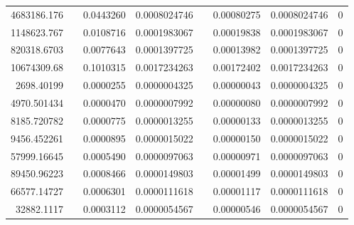 \documentclass[
journal=jacsat, %
manuscript=article]{achemso}
\begin{document}
\begin{table}[htbp]
{\begin{tabular}{rrrrrrrr}
    4683186.176 &       & 0.0443260 & 0.0008024746 &       & 0.00080275 & 0.0008024746 & 0 \\
    1148623.767 &       & 0.0108716 & 0.0001983067 &       & 0.00019838 & 0.0001983067 & 0 \\
    820318.6703 &       & 0.0077643 & 0.0001397725 &       & 0.00013982 & 0.0001397725 & 0 \\
    10674309.68 &       & 0.1010315 & 0.0017234263 &       & 0.00172402 & 0.0017234263 & 0 \\
    2698.40199 &       & 0.0000255 & 0.0000004325 &       & 0.00000043 & 0.0000004325 & 0 \\
    4970.501434 &       & 0.0000470 & 0.0000007992 &       & 0.00000080 & 0.0000007992 & 0 \\
    8185.720782 &       & 0.0000775 & 0.0000013255 &       & 0.00000133 & 0.0000013255 & 0 \\
    9456.452261 &       & 0.0000895 & 0.0000015022 &       & 0.00000150 & 0.0000015022 & 0 \\
    57999.16645 &       & 0.0005490 & 0.0000097063 &       & 0.00000971 & 0.0000097063 & 0 \\
    89450.96223 &       & 0.0008466 & 0.0000149803 &       & 0.00001499 & 0.0000149803 & 0 \\
    66577.14727 &       & 0.0006301 & 0.0000111618 &       & 0.00001117 & 0.0000111618 & 0 \\
    32882.1117 &       & 0.0003112 & 0.0000054567 &       & 0.00000546 & 0.0000054567 & 0 \\
    \bottomrule
    \end{tabular}%
    }
  \label{tab:addlabel}%
\end{table}%
\end{document}
